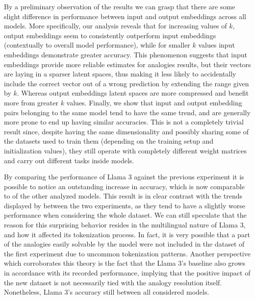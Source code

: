 
By a preliminary observation of the results we can grasp that there are some slight difference in performance between input and output embeddings across all models.
More specifically, our analysis reveals that for increasing values of $k$, output embeddings seem to consistently outperform input embeddings (contextually to overall model performance), while for smaller $k$ values input embeddings demonstrate greater accuracy.
This phenomenon suggests that input embeddings provide more reliable estimates for analogies results, but their vectors are laying in a sparser latent spaces, thus making it less likely to accidentally include the correct vector out of a wrong prediction by extending the range given by $k$.
Whereas output embeddings latent spaces are more compressed and benefit more from greater $k$ values.
Finally, we show that input and output embedding pairs belonging to the same model tend to have the same trend, and are generally more prone to end up having similar accuracies.
This is not a completely trivial result since, despite having the same dimensionality and possibly sharing some of the datasets used to train them (depending on the training setup and initialization values), they still operate with completely different weight matrices and carry out different tasks inside models.

By comparing the performance of Llama 3 against the previous experiment it is possible to notice an outstanding increase in accuracy, which is now comparable to  of the other analyzed models.
This result is in clear contrast with the trends displayed by  between the two experiments, as they tend to have a slightly worse performance when considering the whole dataset.
We can still speculate that the reason for this surprising behavior resides in the multilingual nature of Llama 3, and how it affected its tokenization process.
In fact, it is very possible that a part of the analogies easily solvable by the model were not included in the dataset of the first experiment due to uncommon tokenization patterns.
Another perspective which corroborates this theory is the fact that the Llama 3's baseline also grows in accordance with its recorded performance, implying that the positive impact of the new dataset is not necessarily tied with the analogy resolution  itself.
Nonetheless, Llama 3's accuracy still  between all considered models. 

